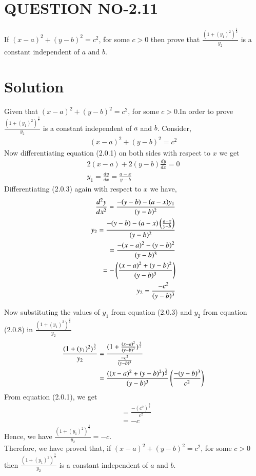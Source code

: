 \documentclass[journal,12pt,twocolumn]{IEEEtran}
\begin{document}
\section{QUESTION NO-2.11}
\item If $(x-a)^2+(y-b)^2 = c^2$, for some $c>0$ then prove that $\frac{(1+(y_{1})^2)^\frac{3}{2}}{y_{2}}$ is a constant independent of $a$ and $b$.
%

%
\section{Solution}
Given that $(x-a)^2+(y-b)^2 = c^2$, for some $c>0$.In order to prove $\frac{(1+(y_{1})^2)^\frac{3}{2}}{y_{2}}$ is a constant independent of $a$ and $b$.
Consider,
\begin{align}
    (x-a)^2+(y-b)^2 = c^2
\end{align}
Now differentiating equation (2.0.1) on both sides with respect to $x$  we get
\begin{align}
    2(x-a)+2(y-b)\frac{dy}{dx} = 0
\\ 
y_{1} = \frac{dy}{dx} = \frac{a-x}{y-b}
\end{align}
Differentiating (2.0.3) again with respect to $x$ we have,
\begin{align}
    \frac{d^2y}{dx^2}= \frac{-(y-b)-(a-x)y_{1}}{(y-b)^2}
    \\
    y_{2} = \frac{-(y-b)-(a-x)\left(\frac{a-x}{y-b}\right)}{(y-b)^2}
    \\
    = \frac{-(x-a)^2-(y-b)^2}{(y-b)^3}
    \\
    = -\left(\frac{(x-a)^2+(y-b)^2}{(y-b)^3}\right)
    \\
   y_{2}= \frac{-c^2}{(y-b)^3}
\end{align}

Now substituting the values of $y_{1}$ from equation (2.0.3) and $y_{2}$ from equation (2.0.8) in 
$\frac{(1+(y_{1})^2)^\frac{3}{2}}{y_{2}}$
\begin{align}
\frac{(1+(y_{1})^2)^\frac{3}{2}}{y_{2}}
&= \frac{(1+\frac{(x-a)^2}{(y-b)^2})^\frac{3}{2}}{\frac{-c^2}{(y-b)^3}}
\\
&= \frac{((x-a)^2+(y-b)^2)^\frac{3}{2}}{(y-b)^3}\left(\frac{-(y-b)^3}{c^2}\right)
\end{align}
From equation (2.0.1), we get
\begin{align}
&= \frac{-(c^2)^\frac{3}{2}}{c^2} 
\\
&= -c  
\end{align}
Hence, we have 
$ \frac{(1+(y_{1})^2)^\frac{3}{2}}{y_{2}}= -c$.
\\
Therefore, we have proved that, if $(x-a)^2+(y-b)^2 = c^2$, for some $c>0$ then $\frac{(1+(y_{1})^2)^\frac{3}{2}}{y_{2}}$ is a constant independent of $a$ and $b$.
\end{document}
